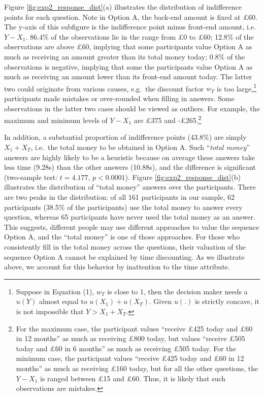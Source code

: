 \documentclass[
  12pt,
]{article}
\begin{document}
Figure \ref{fig:exp2_response_dist}(a) illustrates the distribution of
indifference points for each question. Note in Option A, the back-end
amount is fixed at £60. The y-axis of this subfigure is the indifference
point minus front-end amount, i.e.~\(Y-X_1\). 86.4\% of the observations
lie in the range from £0 to £60; 12.8\% of the observations are above
£60, implying that some participants value Option A as much as receiving
an amount greater than its total money today; 0.8\% of the observations
is negative, implying that some the participants value Option A as much
as receiving an amount lower than its front-end amount today. The latter
two could originate from various causes, e.g.~the discount factor
\(w_T\) is too large,\footnote{Suppose in Equation (1), \(w_T\) is close
  to 1, then the decision maker needs a \(u(Y)\) almost equal to
  \(u(X_1)+u(X_T)\). Given \(u(.)\) is strictly concave, it is not
  impossible that \(Y>X_1+X_T\).} participants made mistakes or
over-rounded when filling in answers. Some observations in the latter
two cases should be viewed as outliers. For example, the maximum and
minimum levels of \(Y-X_1\) are £375 and -£265.\footnote{For the maximum
  case, the participant values ``receive £425 today and £60 in 12
  months'' as much as receiving £800 today, but values ``receive £505
  today and £60 in 6 months'' as much as receiving £505 today. For the
  minimum case, the participant values ``receive £425 today and £60 in
  12 months'' as much as receiving £160 today, but for all the other
  questions, the \(Y-X_1\) is ranged between £15 and £60. Thus, it is
  likely that such observations are mistakes.}

In addition, a substantial proportion of indifference points (43.8\%)
are simply \(X_1 + X_T\), i.e.~the total money to be obtained in Option
A. Such ``\emph{total money}'' answers are highly likely to be a
heuristic because on average these answers take less time (9.28s) than
the other answers (10.88s), and the difference is significant
(two-sample test: \(t=4.177\), \(p<0.0001\)). Figure
\ref{fig:exp2_response_dist}(b) illustrates the distribution of ``total
money'' answers over the participants. There are two peaks in the
distribution: of all 161 participants in our sample, 62 participants
(38.5\% of the participants) use the total money to answer every
question, whereas 65 participants have never used the total money as an
answer. This suggests, different people may use different approaches to
value the sequence Option A, and the ``total money'' is one of those
approaches. For those who consistently fill in the total money across
the questions, their valuation of the sequence Option A cannot be
explained by time discounting. As we illustrate above, we account for
this behavior by inattention to the time attribute.
\end{document}

